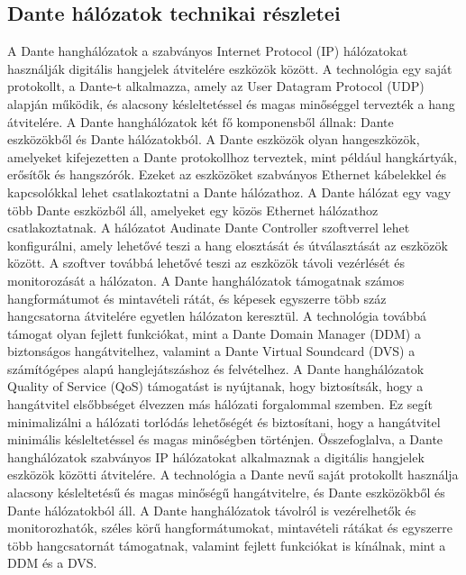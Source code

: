 \subsection{Dante hálózatok technikai részletei}
A Dante hanghálózatok a szabványos Internet Protocol (IP) hálózatokat használják
digitális hangjelek átvitelére eszközök között. A technológia egy saját
protokollt, a Dante-t alkalmazza, amely az User Datagram Protocol (UDP) alapján
működik, és alacsony késleltetéssel és magas minőséggel tervezték a hang
átvitelére. A Dante hanghálózatok két fő komponensből állnak: Dante eszközökből
és Dante hálózatokból. A Dante eszközök olyan hangeszközök, amelyeket
kifejezetten a Dante protokollhoz terveztek, mint például hangkártyák, erősítők
és hangszórók. Ezeket az eszközöket szabványos Ethernet kábelekkel és
kapcsolókkal lehet csatlakoztatni a Dante hálózathoz. A Dante hálózat egy vagy
több Dante eszközből áll, amelyeket egy közös Ethernet hálózathoz
csatlakoztatnak. A hálózatot Audinate Dante Controller szoftverrel lehet
konfigurálni, amely lehetővé teszi a hang elosztását és útválasztását az
eszközök között. A szoftver továbbá lehetővé teszi az eszközök távoli vezérlését
és monitorozását a hálózaton. A Dante hanghálózatok támogatnak számos
hangformátumot és mintavételi rátát, és képesek egyszerre több száz hangcsatorna
átvitelére egyetlen hálózaton keresztül. A technológia továbbá támogat olyan
fejlett funkciókat, mint a Dante Domain Manager (DDM) a biztonságos
hangátvitelhez, valamint a Dante Virtual Soundcard (DVS) a számítógépes alapú
hanglejátszáshoz és felvételhez. A Dante hanghálózatok Quality of Service (QoS)
támogatást is nyújtanak, hogy biztosítsák, hogy a hangátvitel elsőbbséget
élvezzen más hálózati forgalommal szemben. Ez segít minimalizálni a hálózati
torlódás lehetőségét és biztosítani, hogy a hangátvitel minimális késleltetéssel
és magas minőségben történjen. Összefoglalva, a Dante hanghálózatok szabványos
IP hálózatokat alkalmaznak a digitális hangjelek eszközök közötti átvitelére. A
technológia a Dante nevű saját protokollt használja alacsony késleltetésű és
magas minőségű hangátvitelre, és Dante eszközökből és Dante hálózatokból áll. A
Dante hanghálózatok távolról is vezérelhetők és monitorozhatók, széles körű
hangformátumokat, mintavételi rátákat és egyszerre több hangcsatornát támogatnak,
valamint fejlett funkciókat is kínálnak, mint a DDM és a DVS.
